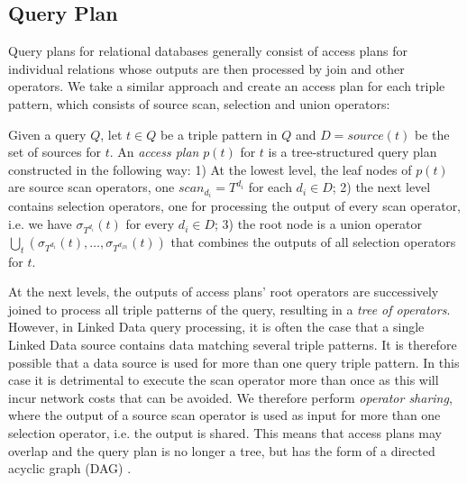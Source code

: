 \subsection{Query Plan}
\label{sec:basicshape}
Query plans for relational databases generally consist of access plans
for individual relations whose outputs are then processed by join and
other operators. We take a similar approach and create an
access plan for each triple pattern, which consists of source scan, selection and union
operators:
\begin{definition}
  Given a query $Q$, let $t \in Q$ be a triple pattern in $Q$ and $D =
  source(t)$ be the set of sources for $t$. An \emph{access plan}
  $p(t)$ for $t$ is a tree-structured query plan constructed in the
  following way: 1) At the lowest level, the leaf nodes of $p(t)$ are
  source scan operators, one $scan_{d_i} = T^{d_i}$ for each $d_i \in
  D$; 2) the next level contains selection operators, one for
  processing the output of every scan operator, i.e. we have
  $\sigma_{T^{d_i}}(t)$ for every $d_i \in D$; 3) the root node is a
  union operator
  $\bigcup_t(\sigma_{T^{d_1}}(t),\ldots,\sigma_{T^{d_{|D|}}}(t))$ that
  combines the outputs of all selection operators for $t$.

\end{definition}
At the next levels, the outputs of access plans' root operators are
successively joined to process all triple patterns of the query,
resulting in a \emph{tree of operators}. However, in Linked Data query
processing, it is often the case that a single Linked Data source
contains data matching several triple patterns. It is therefore
possible that a data source is used for more than one query triple
pattern. In this case it is detrimental to execute the scan operator
more than once as this will incur network costs that can be
avoided. We therefore perform \emph{operator sharing}, where the
output of a source scan operator is used as input for more than one
selection operator, i.e. the output is shared. This means that access
plans may overlap and the query plan is no longer a tree, but
has the form of a directed acyclic graph (DAG) \cite{Neumann_2005}.

